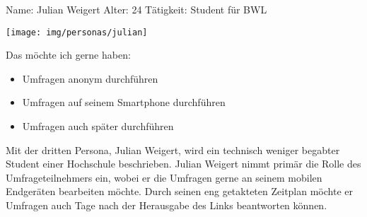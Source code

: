 
\newpage
{}
\begin{minipage}[t]{0.5\textwidth} 	\vspace{0.2\baselineskip} %
	\begin{entrylist}
		\entry
		{Name:}
		{Julian Weigert}
			\entry
		{Alter:}
		{24}
		\entry
		{Tätigkeit:}
		{Student für BWL}
	\end{entrylist}
	\begin{barchart}{5.0}\hspace{-1mm}
	\end{barchart}
\end{minipage}
\hfil
\begin{minipage}[t]{0.4\textwidth} 	\vspace{0.0\baselineskip} %
	\flushright
	\texttt{[image: img/personas/julian]}
\end{minipage}
\autocite{rf-unsplash-student}

Das möchte ich gerne haben:
\begin{itemize}
	\item Umfragen anonym durchführen
    \item Umfragen auf seinem Smartphone durchführen
    \item Umfragen auch später durchführen
\end{itemize}

Mit der dritten Persona, Julian Weigert, wird ein technisch weniger begabter Student einer Hochschule beschrieben.
Julian Weigert nimmt primär die Rolle des Umfrageteilnehmers ein, wobei er die Umfragen gerne an seinem mobilen Endgeräten bearbeiten möchte.
Durch seinen eng getakteten Zeitplan möchte er Umfragen auch Tage nach der Herausgabe des Links beantworten können.
